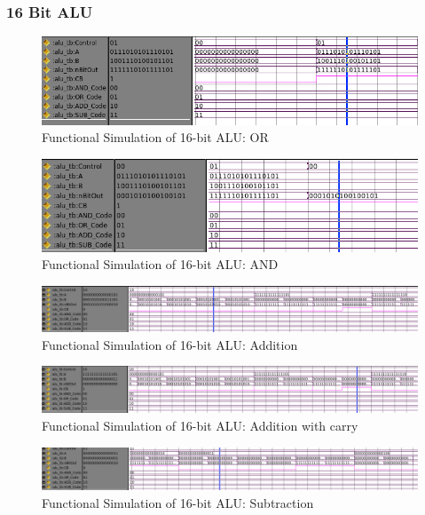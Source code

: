 \documentclass[11pt]{article}
\begin{document}
			
	
		\subsubsection{16 Bit ALU}
		
			\begin{figure}[H]
				\centering
				\includegraphics[width=0.7\linewidth]{"Pictures/16 Bit ALU OR"}
				\caption{Functional Simulation of 16-bit ALU: OR}
				\label{fig:16-bit-alu-or}
			\end{figure}
			
			\begin{figure}[H]
				\centering
				\includegraphics[width=0.7\linewidth]{"Pictures/16 Bit ALU AND"}
				\caption{Functional Simulation of 16-bit ALU: AND}
				\label{fig:16-bit-alu-and}
			\end{figure}
		
			\begin{figure}[H]
				\centering
				\includegraphics[width=0.7\linewidth]{"Pictures/16 Bit ALU Add"}
				\caption{Functional Simulation of 16-bit ALU: Addition}
				\label{fig:16-bit-alu-add}
			\end{figure}

			\begin{figure}[H]
				\centering
				\includegraphics[width=0.7\linewidth]{"Pictures/16 Bit ALU Add Carry"}
				\caption{Functional Simulation of 16-bit ALU: Addition with carry}
				\label{fig:16-bit-alu-add-carry}
			\end{figure}
		
			
			\begin{figure}[H]
				\centering
				\includegraphics[width=0.7\linewidth]{"Pictures/16 Bit Alu Sub Pos"}
				\caption{Functional Simulation of 16-bit ALU: Subtraction}
				\label{fig:16-bit-alu-sub-pos}
			\end{figure}
			
\end{document}
